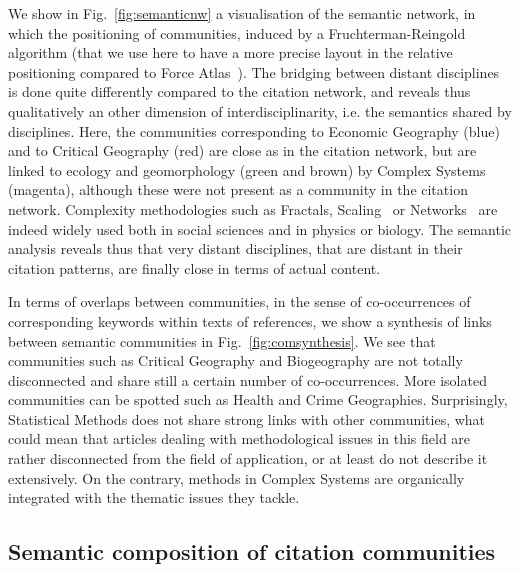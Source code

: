 We show in Fig.~\ref{fig:semanticnw} a visualisation of the semantic network, in which the positioning of communities, induced by a Fruchterman-Reingold algorithm (that we use here to have a more precise layout in the relative positioning compared to Force Atlas~\citep{jacomy2014forceatlas2}). The bridging between distant disciplines is done quite differently compared to the citation network, and reveals thus qualitatively an other dimension of interdisciplinarity, i.e. the semantics shared by disciplines. Here, the communities corresponding to Economic Geography (blue) and to Critical Geography (red) are close as in the citation network, but are linked to ecology and geomorphology (green and brown) by Complex Systems (magenta), although these were not present as a community in the citation network. Complexity methodologies such as Fractals, Scaling~\citep{west2017scale} or Networks~\citep{newman2003structure} are indeed widely used both in social sciences and in physics or biology. The semantic analysis reveals thus that very distant disciplines, that are distant in their citation patterns, are finally close in terms of actual content.



In terms of overlaps between communities, in the sense of co-occurrences of corresponding keywords within texts of references, we show a synthesis of links between semantic communities in Fig.~\ref{fig:comsynthesis}. We see that communities such as Critical Geography and Biogeography are not totally disconnected and share still a certain number of co-occurrences. More isolated communities can be spotted such as Health and Crime Geographies. Surprisingly, Statistical Methods does not share strong links with other communities, what could mean that articles dealing with methodological issues in this field are rather disconnected from the field of application, or at least do not describe it extensively. On the contrary, methods in Complex Systems are organically integrated with the thematic issues they tackle.








\subsection*{Semantic composition of citation communities}


